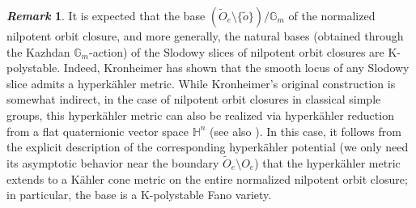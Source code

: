 \documentclass[12pt]{amsart}
\theoremstyle{definition}
\newtheorem{rem}[prop]{\it Remark}
\newcommand{\bG}{\mathbb{G}}
\numberwithin{equation}{section}
\begin{document}

\begin{rem}\label{rem-Kronheimer}
It is expected that the base $\left(\widetilde{O}_e \setminus \{\tilde{o}\}\right)/\bG_m$ of the normalized nilpotent orbit closure, and more generally, the natural bases (obtained through the Kazhdan $\bG_m$-action) of the Slodowy slices of nilpotent orbit closures are K-polystable. Indeed, Kronheimer \cite[Theorem 1 and Remark (ii) thereafter]{Kronheimer-nilpotent} has shown that the smooth locus of any Slodowy slice admits a hyperk\"ahler metric. While Kronheimer's original construction is somewhat indirect, in the case of nilpotent orbit closures in classical simple groups, this hyperk\"ahler metric can also be realized via hyperk\"ahler reduction  from a flat quaternionic vector space $\mathbb H^n$ \cite{KS-classical-nilpotent} (see also \cite[Section 2]{KS-hyperkahler-potential}). In this case, it follows from the explicit description of the corresponding hyperk\"ahler potential (we only need its asymptotic behavior near the boundary $\widetilde{O}_e\setminus O_e$) that the hyperk\"ahler metric extends to a K\"ahler cone metric on the entire normalized nilpotent orbit closure; in particular, the base is a K-polystable Fano variety.  
\end{rem}
\end{document}

